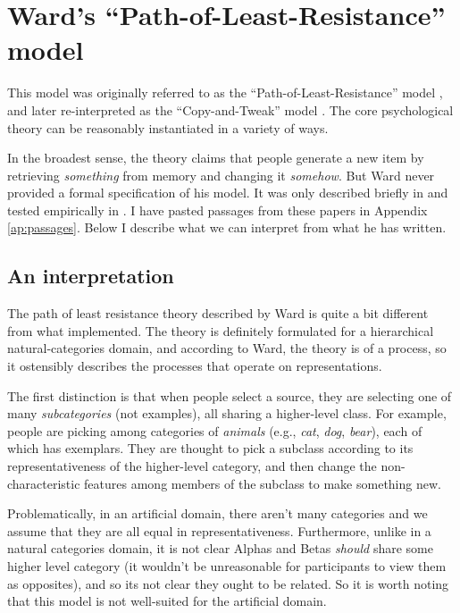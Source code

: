 \documentclass[12pt]{article}
\begin{document}
\section{Ward's ``Path-of-Least-Resistance'' model}

This model was originally referred to as the ``Path-of-Least-Resistance'' model \citep{ward1994structured,ward1995s,ward2002role}, and later re-interpreted as the ``Copy-and-Tweak'' model \citep{jern2013probabilistic}. The core psychological theory can be reasonably instantiated in a variety of ways.

In the broadest sense, the theory claims that people generate a new item by retrieving \textit{something} from memory and changing it \textit{somehow}. But Ward never provided a formal specification of his model. It was only described briefly in \cite{ward1994structured,ward1995s} and tested empirically in \cite{ward2002role}. I have pasted passages from these papers in Appendix \ref{ap:passages}. Below I describe what we can interpret from what he has written.

\subsection{An interpretation}

The path of least resistance theory described by Ward is quite a bit different from what \cite{jern2013probabilistic} implemented. The theory is definitely formulated for a hierarchical natural-categories domain, and according to Ward, the theory is of a process, so it ostensibly describes the processes that operate on representations. 

The first distinction is that when people select a source, they are selecting one of many \textit{subcategories} (not examples), all sharing a higher-level class. For example, people are picking among categories of \textit{animals} (e.g., \textit{cat}, \textit{dog}, \textit{bear}), each of which has exemplars. They are thought to pick a subclass according to its representativeness of the higher-level category, and then change the non-characteristic features among members of the subclass to make something new.

Problematically, in an artificial domain, there aren't many categories and we assume that they are all equal in representativeness. Furthermore, unlike in a natural categories domain, it is not clear Alphas and Betas \textit{should} share some higher level category (it wouldn't be unreasonable for participants to view them as opposites), and so its not clear they ought to be related. So it is worth noting that this model is not well-suited for the artificial domain.
\end{document}
